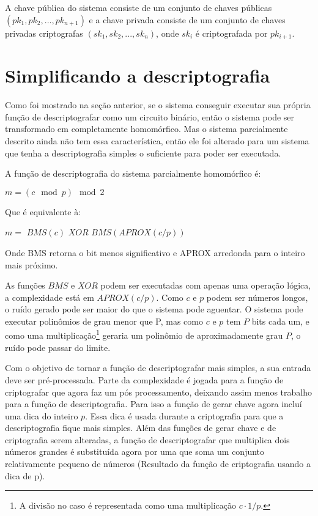 A chave pública do sistema consiste de um conjunto de chaves públicas $(pk_1, pk_2, ..., pk_{n+1})$ e a chave privada consiste de um conjunto de chaves privadas criptografas $(sk_1, sk_2, ..., sk_n)$, onde $sk_i$ é criptografada por $pk_{i+1}$.

\section{Simplificando a descriptografia}
Como foi mostrado na seção anterior, se o sistema conseguir executar sua própria função de descriptografar como um circuito binário, então o sistema pode ser transformado em completamente homomórfico.
Mas o sistema parcialmente descrito ainda não tem essa característica, então ele foi alterado para um sistema que tenha a descriptografia simples o suficiente para poder ser executada.
  	
A função de descriptografia do sistema parcialmente homomórfico é:
\begin{center} $m = (c \mod p) \mod 2$ \end{center}
Que é equivalente à:
\begin{center} $m =$ $BMS(c)$ $XOR$ $BMS(APROX(c/p))$ \end{center}
Onde BMS retorna o bit menos significativo e APROX arredonda para o inteiro mais próximo.
  	
As funções $BMS$ e $XOR$ podem ser executadas com apenas uma operação lógica, a complexidade está em $APROX(c/p)$. Como $c$ e $p$ podem ser números longos, o ruído gerado pode ser maior do que o sistema pode aguentar. O sistema pode executar polinômios de grau menor que P, mas como $c$ e $p$ tem $P$ bits cada um, e como uma multiplicação\footnote{A divisão no caso é representada como uma multiplicação $c \cdot 1/p$.} geraria um polinômio de aproximadamente grau $P$, o ruído pode passar do limite.
  	
Com o objetivo de tornar a função de descriptografar mais simples, a sua entrada deve ser pré-processada. Parte da complexidade é jogada para a função de criptografar que agora faz um pós processamento, deixando assim menos trabalho para a função de descriptografia.
Para isso a função de gerar chave agora incluí uma dica do inteiro $p$. Essa dica é usada durante a criptografia para que a descriptografia fique mais simples.
Além das funções de gerar chave e de criptografia serem alteradas, a função de descriptografar que multiplica dois números grandes é substituída agora por uma que soma um conjunto relativamente pequeno de números (Resultado da função de criptografia usando a dica de p).
  	
